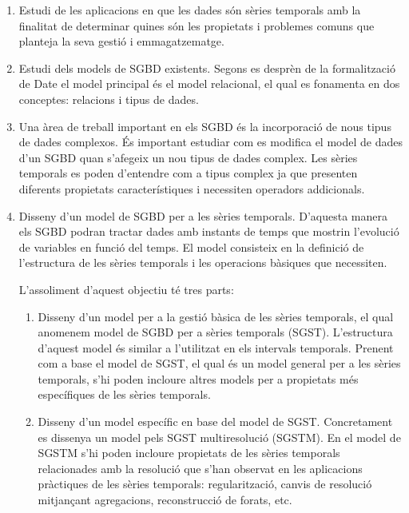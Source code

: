 \begin{enumerate}

\item Estudi de les aplicacions en que les dades són sèries temporals
  amb la finalitat de determinar quines són les propietats i problemes
  comuns que planteja la seva gestió i emmagatzematge.

\item Estudi dels models de SGBD existents. Segons es desprèn de la
  formalització de Date%
  el model principal és el model relacional, el qual es fonamenta en
  dos conceptes: relacions i tipus de dades.

\item Una àrea de treball important en els SGBD és la incorporació de
  nous tipus de dades complexos. És important estudiar com es modifica
  el model de dades d'un SGBD quan s'afegeix un nou tipus de dades
  complex.  Les sèries temporals es poden d'entendre com a tipus
  complex ja que presenten diferents propietats característiques i
  necessiten operadors addicionals.  

\item Disseny d'un model de SGBD per a les sèries temporals. D'aquesta
  manera els SGBD podran tractar dades amb instants de temps que
  mostrin l'evolució de variables en funció del temps. El model
  consisteix en la definició de l'estructura de les sèries temporals i
  les operacions bàsiques que necessiten.

  L'assoliment d'aquest objectiu té tres parts:

  \begin{enumerate}
  \item Disseny d'un model per a la gestió bàsica de les sèries
    temporals, el qual anomenem model de SGBD per a sèries temporals
    (SGST).  L'estructura d'aquest model és similar a l'utilitzat en
    els intervals
    temporals. %
    Prenent com a base el model de SGST, el qual és un model general
    per a les sèries temporals, s'hi poden incloure altres models per
    a propietats més específiques de les sèries temporals.

  \item Disseny d'un model específic en base del model de
    SGST. Concretament es dissenya un model pels SGST multiresolució
    (SGSTM).  En el model de SGSTM s'hi poden incloure propietats de
    les sèries temporals relacionades amb la resolució que s'han
    observat en les aplicacions pràctiques de les sèries temporals:
    regularització, canvis de resolució mitjançant agregacions,
    reconstrucció de forats, etc.
 

\end{enumerate}
\end{enumerate}
